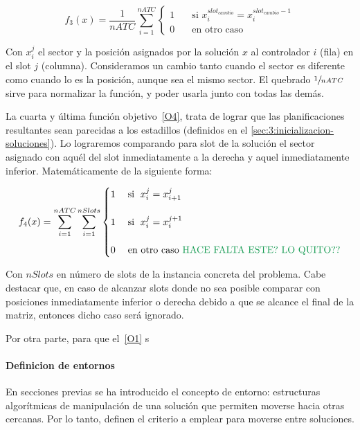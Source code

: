 \[
	f_3(x) = \frac{1}{nATC} \sum_{i=1}^{nATC} 
	\begin{cases}
		1 & \quad \textrm{si } x_i^{slot_{cambio}} = x_i^{slot_{cambio}-1} \\
		0 & \quad \textrm{en otro caso }
	\end{cases}
\]



Con $x_i^j$ el sector y la posición asignados por la solución $x$ al controlador $i$ (fila) en el slot $j$ (columna). Consideramos un cambio tanto cuando el sector es diferente como cuando lo es la posición, aunque sea el mismo sector.
El quebrado $\sfrac{1}{nATC}$ sirve para normalizar la función, y poder usarla junto con todas las demás. 

La cuarta y última función objetivo~\ref{O4}, trata de lograr que las planificaciones resultantes sean parecidas a los estadillos (definidos en el \autoref{sec:3:inicializacion-soluciones}). Lo lograremos comparando para slot de la solución el sector asignado con aquél del slot inmediatamente a la derecha y aquel inmediatamente inferior. Matemáticamente de la siguiente forma:

\[
	f_4(x) = \sum_{i=1}^{nATC} \sum_{i=1}^{nSlots}
	\begin{cases}
		1 & \; \textrm{si } \; x_i^j = x_{i+1}^{j} \\
													\\
		1 & \; \textrm{si } \; x_i^j = x_{i}^{j+1}   \\
													  \\
		0 & \; \textrm{en otro caso }  \NOTE{\textrm{HACE FALTA ESTE? LO QUITO??}}
	\end{cases}
\]

Con $nSlots$ en número de slots de la instancia concreta del problema. Cabe destacar que, en caso de alcanzar slots
donde no sea posible comparar con posiciones inmediatamente inferior o derecha debido a que se alcance el final de la matriz, entonces dicho caso será ignorado.

Por otra parte, para que el~\ref{O1} s

\paragraph{Definicion de entornos} \label{paragraph:entornos}
En secciones previas se ha introducido el concepto de entorno: estructuras algorítmicas de manipulación de una solución que permiten moverse hacia otras cercanas. Por lo tanto, definen el criterio a emplear para moverse entre soluciones.

